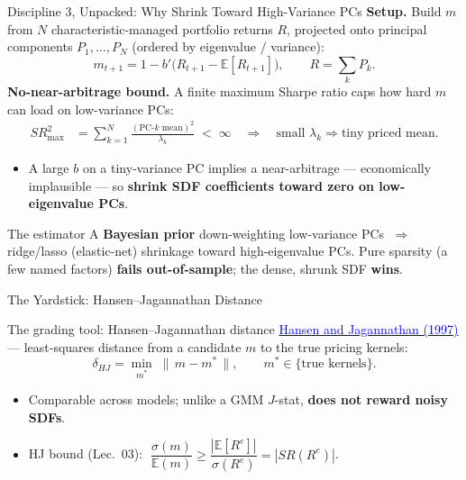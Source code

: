 \documentclass{beamer}
\newcommand{\E}{\mathbb{E}}
\begin{document}
\begin{frame}{Discipline 3, Unpacked: Why Shrink Toward High-Variance PCs}
\textbf{Setup.} Build $m$ from $N$ characteristic-managed portfolio returns $R$, projected onto principal components $P_1,\dots,P_N$ (ordered by eigenvalue / variance):
\begin{equation*}
m_{t+1} = 1 - b'\big(R_{t+1} - \E[R_{t+1}]\big), \qquad R = \textstyle\sum_k P_k .
\end{equation*}
\textbf{No-near-arbitrage bound.} A finite maximum Sharpe ratio caps how hard $m$ can load on \alert{low-variance} PCs:
\begin{align*}
SR^2_{\max} &= \sum_{k=1}^{N} \frac{(\text{PC-}k \text{ mean})^2}{\lambda_k} \;<\; \infty
\quad\Longrightarrow\quad
\text{small } \lambda_k \Rightarrow \text{tiny priced mean.}
\end{align*}
\begin{itemize}
\item A large $b$ on a tiny-variance PC implies a near-arbitrage --- economically implausible --- so \textbf{shrink SDF coefficients toward zero on low-eigenvalue PCs}.
\end{itemize}
\begin{block}{The estimator}
A \textbf{Bayesian prior} down-weighting low-variance PCs $\;\Rightarrow\;$ ridge/lasso (elastic-net) shrinkage toward \alert{high-eigenvalue} PCs. Pure sparsity (a few named factors) \textbf{fails out-of-sample}; the dense, shrunk SDF \textbf{wins}.
\end{block}
\end{frame}

\begin{frame}{The Yardstick: Hansen--Jagannathan Distance}
\begin{block}{The grading tool: Hansen--Jagannathan distance}
\href{https://doi.org/10.1111/j.1540-6261.1997.tb04813.x}{\textcolor{blue}{Hansen and Jagannathan (1997)}} --- least-squares distance from a candidate $m$ to the true pricing kernels:
\begin{equation*}
\delta_{HJ} = \min_{m^{\ast}}\; \big\|\, m - m^{\ast} \,\big\|, \qquad m^{\ast}\in\{\text{true kernels}\}.
\end{equation*}
\begin{itemize}
\item Comparable across models; unlike a GMM $J$-stat, \textbf{does not reward noisy SDFs}.
\item HJ bound (Lec.\ 03): $\;\dfrac{\sigma(m)}{\E(m)} \ge \dfrac{|\E[R^e]|}{\sigma(R^e)} = |SR(R^e)|$.
\end{itemize}
\end{block}
\end{frame}
\end{document}
